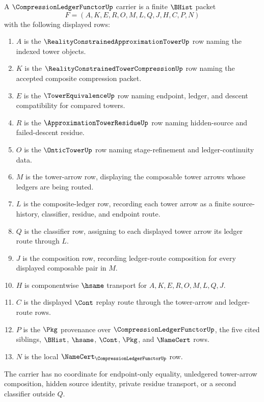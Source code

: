 \begin{definition}
\label{def:compression-ledger-functor-carrier}
A $\CompressionLedgerFunctorUp$ carrier is a finite $\BHist$ packet
$$
F=(A,K,E,R,O,M,L,Q,J,H,C,P,N)
$$
with the following displayed rows:
\begin{enumerate}
\item $A$ is the $\RealityConstrainedApproximationTowerUp$ row naming the indexed tower objects.
\item $K$ is the $\RealityConstrainedTowerCompressionUp$ row naming the accepted composite compression packet.
\item $E$ is the $\TowerEquivalenceUp$ row naming endpoint, ledger, and descent compatibility for compared towers.
\item $R$ is the $\ApproximationTowerResidueUp$ row naming hidden-source and failed-descent residue.
\item $O$ is the $\OnticTowerUp$ row naming stage-refinement and ledger-continuity data.
\item $M$ is the tower-arrow row, displaying the composable tower arrows whose ledgers are being routed.
\item $L$ is the composite-ledger row, recording each tower arrow as a finite source-history, classifier, residue, and endpoint route.
\item $Q$ is the classifier row, assigning to each displayed tower arrow its ledger route through $L$.
\item $J$ is the composition row, recording ledger-route composition for every displayed composable pair in $M$.
\item $H$ is componentwise $\hsame$ transport for $A,K,E,R,O,M,L,Q,J$.
\item $C$ is the displayed $\Cont$ replay route through the tower-arrow and ledger-route rows.
\item $P$ is the $\Pkg$ provenance over $\CompressionLedgerFunctorUp$, the five cited siblings, $\BHist$, $\hsame$, $\Cont$, $\Pkg$, and $\NameCert$ rows.
\item $N$ is the local $\NameCert_{\CompressionLedgerFunctorUp}$ row.
\end{enumerate}
The carrier has no coordinate for endpoint-only equality, unledgered tower-arrow composition, hidden source identity, private residue transport, or a second classifier outside $Q$.
\end{definition}

